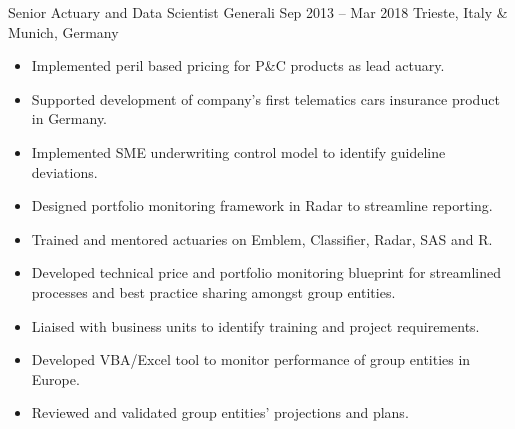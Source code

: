 \documentclass[a4paper,]{fortysecondscv}
\begin{document}
\begin{cvtable}
{\begin{itemize}[nosep, leftmargin=12pt , label={-}]
        \end{itemize}
    }
    \vspace{\topsep}
    \cvitemoneblock
    {Senior Actuary and Data Scientist}
    {Generali}
    {Sep 2013 -- Mar 2018}
    {Trieste, Italy \& Munich, Germany}
    {
        \begin{itemize}[nosep, leftmargin=12pt , label={-}] %
            \item Implemented peril based pricing for P\&C products as lead actuary.
            \item Supported development of company's first telematics cars insurance product in Germany.
            \item Implemented SME underwriting control model to identify guideline deviations.
            \item Designed portfolio monitoring framework in Radar to streamline reporting.
            \item Trained and mentored actuaries on Emblem, Classifier, Radar, SAS and R.
            \item Developed technical price and portfolio monitoring blueprint for streamlined processes and best practice sharing amongst group entities.
            \item Liaised with business units to identify training and project requirements.
            \item Developed VBA\//Excel tool to monitor performance of group entities in Europe.
            \item Reviewed and validated group entities' projections and plans.
        \end{itemize}
    }

\end{cvtable}
\end{document}
